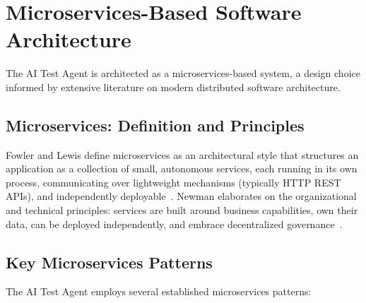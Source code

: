 \section{Microservices-Based Software Architecture}
\label{sec:microservices}

The AI Test Agent is architected as a microservices-based system, a
design choice informed by extensive literature on modern distributed
software architecture.

\subsection{Microservices: Definition and Principles}
\label{subsec:microservices_def}

Fowler and Lewis define microservices as an architectural style that
structures an application as a collection of small, autonomous services,
each running in its own process, communicating over lightweight
mechanisms (typically HTTP REST APIs), and independently
deployable~\cite{fowler2014microservices}. Newman elaborates on the
organizational and technical principles: services are built around
business capabilities, own their data, can be deployed independently,
and embrace decentralized governance~\cite{newman2021microservices}.

\subsection{Key Microservices Patterns}
\label{subsec:microservices_patterns}

The AI Test Agent employs several established microservices patterns:

